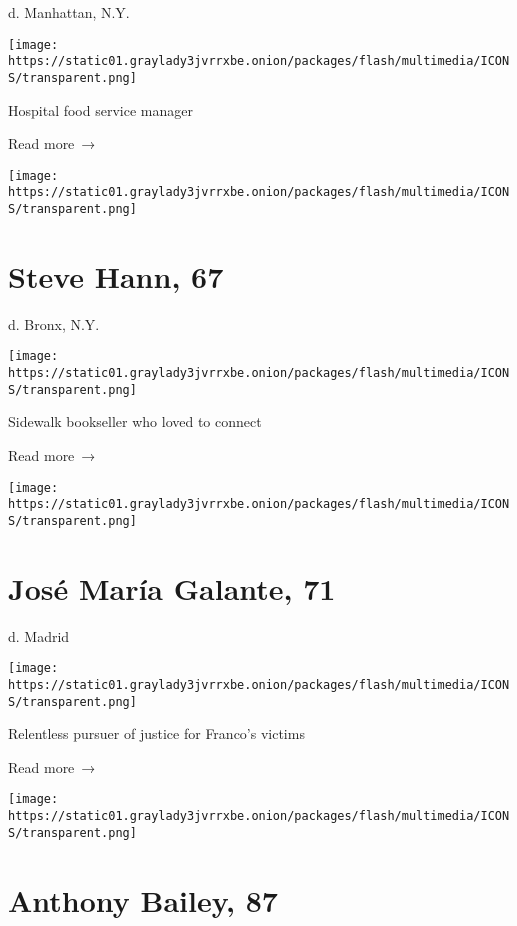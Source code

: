 d. Manhattan, N.Y.

\texttt{[image: https://static01.graylady3jvrrxbe.onion/packages/flash/multimedia/ICONS/transparent.png]}

Hospital food service manager

 Read more~→

\href{https://www.nytimes3xbfgragh.onion/2020/05/27/obituaries/steve-hann-dead-coronavirus.html}{}

\texttt{[image: https://static01.graylady3jvrrxbe.onion/packages/flash/multimedia/ICONS/transparent.png]}

\hypertarget{steve-hann-67}{%
\section{Steve Hann, 67}\label{steve-hann-67}}

d. Bronx, N.Y.

\texttt{[image: https://static01.graylady3jvrrxbe.onion/packages/flash/multimedia/ICONS/transparent.png]}

Sidewalk bookseller who loved to connect

 Read more~→

\href{https://www.nytimes3xbfgragh.onion/2020/05/27/obituaries/jose-maria-galante-dead-coronavirus.html}{}

\texttt{[image: https://static01.graylady3jvrrxbe.onion/packages/flash/multimedia/ICONS/transparent.png]}

\hypertarget{josuxe9-maruxeda-galante-71}{%
\section{José María Galante, 71}\label{josuxe9-maruxeda-galante-71}}

d. Madrid

\texttt{[image: https://static01.graylady3jvrrxbe.onion/packages/flash/multimedia/ICONS/transparent.png]}

Relentless pursuer of justice for Franco's victims

 Read more~→

\href{https://www.nytimes3xbfgragh.onion/2020/05/26/books/anthony-bailey-dead-coronavirus.html}{}

\texttt{[image: https://static01.graylady3jvrrxbe.onion/packages/flash/multimedia/ICONS/transparent.png]}

\hypertarget{anthony-bailey-87}{%
\section{Anthony Bailey, 87}\label{anthony-bailey-87}}

